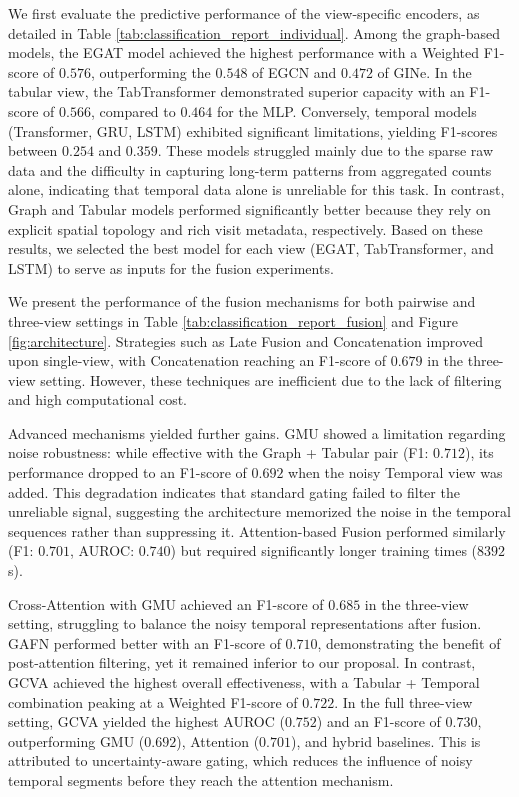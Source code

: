 \documentclass[journal]{IEEEtran}
\begin{document}
We first evaluate the predictive performance of the view-specific encoders, as detailed in Table \ref{tab:classification_report_individual}. Among the graph-based models, the EGAT model achieved the highest performance with a Weighted F1-score of $0.576$, outperforming the $0.548$ of EGCN and $0.472$ of GINe. In the tabular view, the TabTransformer demonstrated superior capacity with an F1-score of $0.566$, compared to $0.464$ for the MLP. Conversely, temporal models (Transformer, GRU, LSTM) exhibited significant limitations, yielding F1-scores between $0.254$ and $0.359$. These models struggled mainly due to the sparse raw data and the difficulty in capturing long-term patterns from aggregated counts alone, indicating that temporal data alone is unreliable for this task. In contrast, Graph and Tabular models performed significantly better because they rely on explicit spatial topology and rich visit metadata, respectively. Based on these results, we selected the best model for each view (EGAT, TabTransformer, and LSTM) to serve as inputs for the fusion experiments.


We present the performance of the fusion mechanisms for both pairwise and three-view settings in Table \ref{tab:classification_report_fusion} and Figure \ref{fig:architecture}. Strategies such as Late Fusion and Concatenation improved upon single-view, with Concatenation reaching an F1-score of $0.679$ in the three-view setting. However, these techniques are inefficient due to the lack of filtering and high computational cost.


Advanced mechanisms yielded further gains. GMU showed a limitation regarding noise robustness: while effective with the Graph + Tabular pair (F1: $0.712$), its performance dropped to an F1-score of $0.692$ when the noisy Temporal view was added. This degradation indicates that standard gating failed to filter the unreliable signal, suggesting the architecture memorized the noise in the temporal sequences rather than suppressing it. Attention-based Fusion performed similarly (F1: $0.701$, AUROC: $0.740$) but required significantly longer training times ($8392$s). 

Cross-Attention with GMU achieved an F1-score of $0.685$ in the three-view setting, struggling to balance the noisy temporal representations after fusion. GAFN performed better with an F1-score of $0.710$, demonstrating the benefit of post-attention filtering, yet it remained inferior to our proposal. In contrast, GCVA achieved the highest overall effectiveness, with a Tabular + Temporal combination peaking at a Weighted F1-score of $0.722$. In the full three-view setting, GCVA yielded the highest AUROC ($0.752$) and an F1-score of $0.730$, outperforming GMU ($0.692$), Attention ($0.701$), and hybrid baselines. This is attributed to uncertainty-aware gating, which reduces the influence of noisy temporal segments before they reach the attention mechanism.
\end{document}
